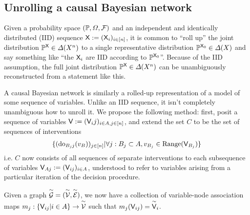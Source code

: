 \subsection{Unrolling a causal Bayesian network}\label{sec:unrolling}

Given a probability space $(\mathbb{P},\Omega,\mathcal{F})$ and an independent and identically distributed (IID) sequence $\mathsf{X}:=(\mathsf{X}_i)_{i\in [n]}$, it is common to ``roll up'' the joint distribution $\mathbb{P}^{\mathsf{X}}\in\Delta(X^n)$ to a single representative distribution $\mathbb{P}^{\mathsf{X}_0}\in \Delta(X)$ and say something like ``the $\mathsf{X}_i$ are IID according to $\mathbb{P}^{\mathsf{X}_0}$''. Because of the IID assumption, the full joint distribution $\mathbb{P}^{\mathsf{X}}\in\Delta(X^n)$ can be unambiguously reconstructed from a statement like this.

A causal Bayesian network is similarly a rolled-up representation of a model of some sequence of variables. Unlike an IID sequence, it isn't completely unambiguous how to unroll it. We propose the following method: first, posit a sequence of variables $\mathsf{V}:= (\mathsf{V}_ij)_{i\in A,j\in [n]}$, and extend the set $C$ to be the set of sequences of interventions 
\begin{align}
\{(\mathrm{do}_{B_j j}(v_B))_{j\in [n]}|\forall j: B_j \subset A,v_{B_j}\in \mathrm{Range}(\mathsf{V}_{B_j})\}
\end{align}
i.e. $C$ now consists of all sequences of separate interventions to each subsequence of variables $\mathsf{V}_{Aj}:=(\mathsf{V}_{ij})_{i\in A}$, understood to refer to variables arising from a particular iteration of the decision procedure. 

Given a graph $\overset{\sim}{\mathcal{G}}=(\overset{\sim}{\mathcal{V}},\overset{\sim}{\mathcal{E}})$, we now have a collection of variable-node association maps $m_j:\{\mathsf{V}_{ij}|i\in A\}\to \overset{\sim}{\mathcal{V}}$ such that $m_j(\mathsf{V}_{ij})=\overset{\sim}{\mathsf{V}}_i$.

